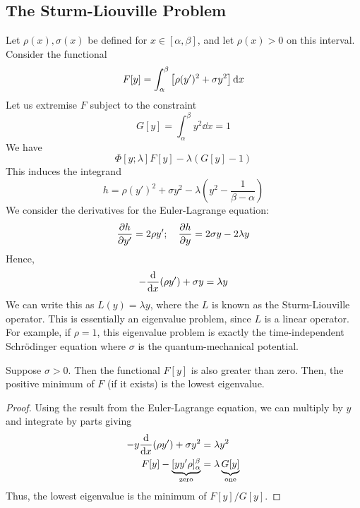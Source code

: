 \subsection{The Sturm-Liouville Problem}
Let \( \rho(x), \sigma(x) \) be defined for \( x \in [\alpha, \beta] \), and let \( \rho(x) > 0 \) on this interval.
Consider the functional
\[
	F[y] = \int_\alpha^\beta \qty[ \rho (y')^2 + \sigma y^2 ]\dd{x}
\]
Let us extremise \( F \) subject to the constraint
\[
	G[y] = \int_\alpha^\beta y^2 \dd{x} = 1
\]
We have
\[
	\Phi[y;\lambda]  F[y] - \lambda (G[y] - 1)
\]
This induces the integrand
\[
	h = \rho (y')^2 + \sigma y^2 - \lambda (y^2 - \frac{1}{\beta - \alpha})
\]
We consider the derivatives for the Euler-Lagrange equation:
\[
	\pdv{h}{y'} = 2 \rho y';\quad \pdv{h}{y} = 2 \sigma y - 2 \lambda y
\]
Hence,
\[
	-\dv{x}\qty(\rho y') + \sigma y = \lambda y
\]
We can write this as \( L(y) = \lambda y \), where the \( L \) is known as the Sturm-Liouville operator.
This is essentially an eigenvalue problem, since \( L \) is a linear operator.
For example, if \( \rho = 1 \), this eigenvalue problem is exactly the time-independent Schr\"odinger equation where \( \sigma \) is the quantum-mechanical potential.

Suppose \( \sigma > 0 \).
Then the functional \( F[y] \) is also greater than zero.
Then, the positive minimum of \( F \) (if it exists) is the lowest eigenvalue.
\begin{proof}
	Using the result from the Euler-Lagrange equation, we can multiply by \( y \) and integrate by parts giving
	\begin{align*}
		-y\dv{x}\qty(\rho y') + \sigma y^2                         & = \lambda y^2                            \\
		F[y] - \underbrace{[y y' \rho]_\alpha^\beta}_{\text{zero}} & = \lambda \underbrace{G[y]}_{\text{one}}
	\end{align*}
	Thus, the lowest eigenvalue is the minimum of \( F[y] / G[y] \).
\end{proof}

